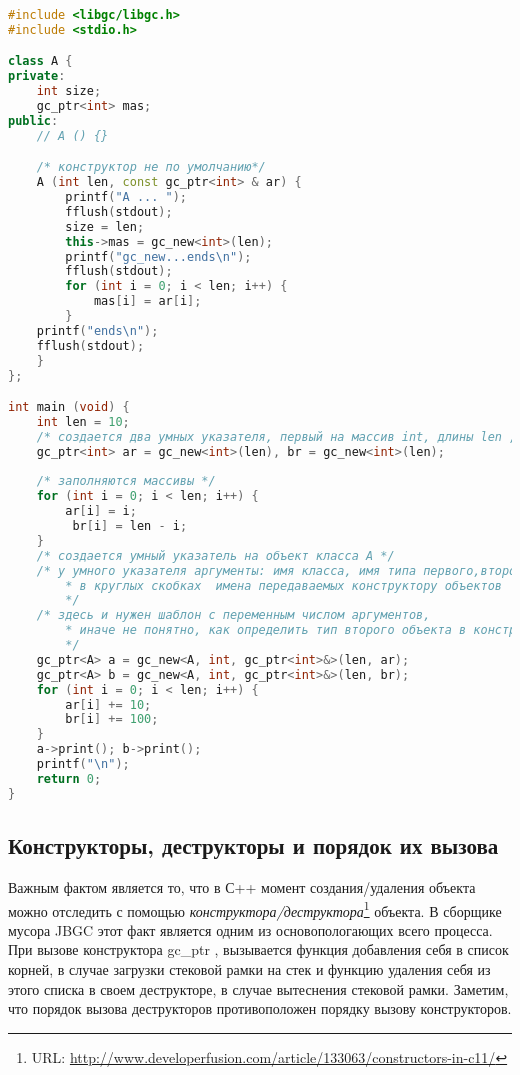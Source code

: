\begin{lstlisting}[language= C++]
#include <libgc/libgc.h>
#include <stdio.h>

class A {
private:
	int size;
	gc_ptr<int> mas;
public:
  	// A () {}

	/* конструктор не по умолчанию*/
	A (int len, const gc_ptr<int> & ar) {
		printf("A ... ");
		fflush(stdout);
		size = len;
		this->mas = gc_new<int>(len);
		printf("gc_new...ends\n");
		fflush(stdout);
		for (int i = 0; i < len; i++) {
			mas[i] = ar[i];
		}
	printf("ends\n");
	fflush(stdout);
  	}
};

int main (void) {
	int len = 10;
	/* создается два умных указателя, первый на массив int, длины len ,второй такой же */
	gc_ptr<int> ar = gc_new<int>(len), br = gc_new<int>(len);
	
	/* заполняются массивы */
	for (int i = 0; i < len; i++) {
		ar[i] = i;
		 br[i] = len - i;
	}
	/* создается умный указатель на объект класса А */
	/* у умного указателя аргументы: имя класса, имя типа первого,второго поля;
	    * в круглых скобках  имена передаваемых конструктору объектов
	    */
	/* здесь и нужен шаблон с переменным числом аргументов,
	    * иначе не понятно, как определить тип второго объекта в конструкторе 
	    */
	gc_ptr<A> a = gc_new<A, int, gc_ptr<int>&>(len, ar);
	gc_ptr<A> b = gc_new<A, int, gc_ptr<int>&>(len, br);
	for (int i = 0; i < len; i++) {
		ar[i] += 10;
		br[i] += 100;
  	}
	a->print(); b->print();
	printf("\n");
	return 0;
}

\end{lstlisting}
 \subsection{Конструкторы, деструкторы и порядок их вызова} 

Важным фактом является то, что в С++  момент создания/удаления объекта можно отследить с помощью \textit{конструктора/деструктора}\footnote{URL: \url{http://www.developerfusion.com/article/133063/constructors-in-c11/}} объекта. В сборщике мусора JBGC этот факт является одним из основопологающих всего процесса. При вызове конструктора gc\_ptr , вызывается функция добавления себя в список корней, в случае загрузки стековой рамки на стек и функцию удаления себя из этого списка в своем деструкторе, в случае вытеснения стековой рамки. Заметим, что порядок вызова деструкторов противоположен порядку вызову конструкторов. 